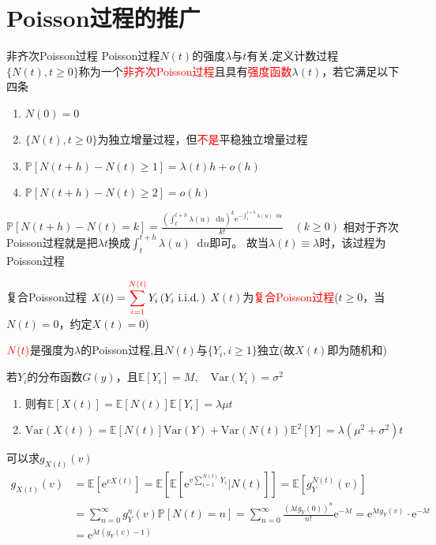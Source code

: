 \documentclass{elegantbook}
\newcommand\iid{\,\text{i.i.d.}\,}
\newcommand\var{\text{Var}}
\renewcommand\d{\mathop{}\!\mathrm{d}}
\newcommand\p{\mathbb{P}}
\newcommand\e{\mathrm{e}}
\newcommand\E{\mathbb{E}}
\begin{document}
\section{Poisson过程的推广}
\begin{definition}{非齐次Poisson过程}{}
    Poisson过程$N(t)$的强度$\lambda$与$t$有关.定义计数过程$\{N(t),t\geq 0\}$称为一个\textcolor{red}{非齐次Poisson过程}且具有\textcolor{red}{强度函数}$\lambda(t)$，若它满足以下四条
    \begin{enumerate}
        \item $N(0)=0$
        \item $\{N(t),t\geq 0\}$为独立增量过程，但\textcolor{red}{不是}平稳独立增量过程
        \item $\p [N(t+h)-N(t)\geq 1]=\lambda (t)h+o(h)$
        \item $\p [N(t+h)-N(t)\geq 2]=o(h)$
    \end{enumerate}
\end{definition}
\begin{remark}
    $\displaystyle \p [N(t+h)-N(t)=k]=\frac{\left(\int_{t}^{t+h}\lambda(u)\d u\right)^k\e ^{-\int_{t}^{t+h}\lambda(u)\d u}}{k!}\quad (k\geq 0)$
    相对于齐次Poisson过程就是把$\lambda t$换成$\displaystyle \int_{t}^{t+h}\lambda(u)\d u$即可。
    故当$\lambda(t)\equiv \lambda$时，该过程为Poisson过程
\end{remark}

\begin{definition}{复合Poisson过程}{}
    $\displaystyle X(t)=\sum_{i=1}^{\color{red} N(t)}Y_i\, (Y_i\, \iid)$ $X(t)$为\textcolor{red}{复合Poisson过程}($t\geq 0$，当$N(t)=0$，约定$X(t)=0$)
    \par $\color{red} N(t)$是强度为$\lambda$的Poisson过程,且$N(t)$与$\{Y_i,i\geq 1\}$独立(故$X(t)$即为随机和)
    \par 若$Y_i$的分布函数$G(y)$，且$\E [Y_i]=M, \quad \var (Y_i)=\sigma ^2$
    \begin{enumerate}
        \item 则有$\E [X(t)]=\E [N(t)]\E [Y_i]=\lambda \mu t$
        \item $\var (X(t))=\E [N(t)]\var (Y)+\var (N(t))\E ^2[Y]=\lambda (\mu ^2+\sigma ^2)t$
    \end{enumerate}
\end{definition}
\begin{remark}
    可以求$g_{X(t)}(v)$
    \[\begin{aligned}
        g_{X(t)}(v)&=\E [\e ^{vX(t)}]=\E [\E [\e ^{v\sum_{i=1}^{N(t)}Y_i}|N(t)]]=\E [g_Y^{N(t)}(v)]\\
        &=\sum_{n=0}^{\infty}g_Y^n(v)\p [N(t)=n]=\sum_{n=0}^{\infty}\frac{(\lambda tg_Y(0))^n}{n!}\e ^{-\lambda t}=\e ^{\lambda tg_Y(v)}\cdot \e ^{-\lambda t}\\
        &=\e ^{\lambda t(g_Y(v)-1)}
    \end{aligned}\]
\end{remark}
\end{document}
